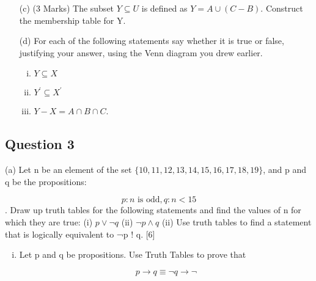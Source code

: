\documentclass[12pt]{article} %
\begin{document}
\begin{itemize}
\item[(c)] (3 Marks) The subset $Y \subseteq U$ is defined as $Y = A \cup (C − B)$. Construct the membership
table for Y. 
\item[(d)] For each of the following statements say whether it is true or false, justifying
your answer, using the Venn diagram you drew earlier.

\begin{enumerate}[(i)]
\item $Y \subseteq X$
\item $Y^{\prime} \subseteq X^{\prime}$
\item $Y − X = A \cap B \cap C$.
\end{enumerate}
\end{itemize}
\subsection*{Question 3}
(a) Let n be an element of the set $\{10, 11, 12, 13, 14, 15, 16, 17, 18, 19\}$,
and p and q be the propositions:

\[p : n \mbox{ is odd},   q : n < 15\].
Draw up truth tables for the following statements and find the values of n for
which they are true:
(i) $ p \vee \neg q$ (ii) $\neg p \wedge q$
(ii) Use truth tables to find a statement that is logically equivalent to ¬p ! q.
[6]
\begin{enumerate}[(i)]
\item Let p and q be propositions. Use Truth Tables to prove that

\[ p \rightarrow q \equiv \neg q \rightarrow \neg\]
\end{enumerate}
\end{document}
